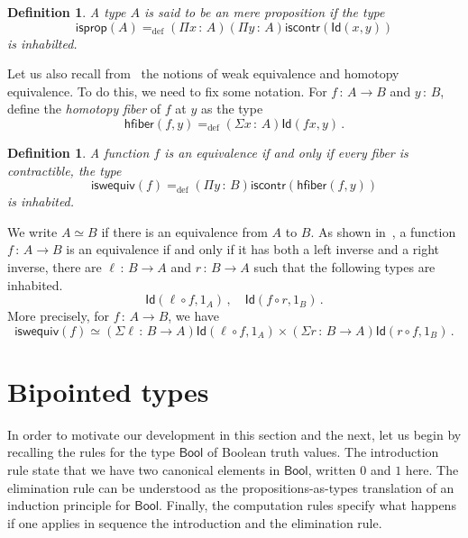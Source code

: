 \documentclass[10pt,a4paper,oneside,reqno]{amsart}
\theoremstyle{mythm}
\theoremstyle{mydef}
\newtheorem{definition}[theorem]{Definition}
\theoremstyle{myrmk}
\newcommand{\ie}{\text{i.e.\ }}
\newcommand{\defeq}{=_{\mathrm{def}}}
\newcommand{\co}{\,{:}\,}
\newcommand{\hfiber}{\mathsf{hfiber}}
\newcommand{\iscontr}{\mathsf{iscontr}}
\newcommand{\isprop}{\mathsf{isprop}}
\newcommand{\iswequiv}{\mathsf{iswequiv}}
\newcommand{\Bool}{\mathsf{Bool}}
\newcommand{\Id}{\mathsf{Id}}
\begin{document}
\begin{definition} A type $A$ is said to be an \emph{mere proposition} if the type
\[
\isprop(A) \defeq (\Pi x \co A)(\Pi  y \co A) \iscontr( \Id(x,y)) 
\]
is inhabilted.
\end{definition}

Let us also recall from~\cite{VoevodskyV:unifc} the notions of weak equivalence and homotopy equivalence. To do this, we need to fix some notation. For $f \co A \rightarrow B$ and $y \co B$, define the \emph{homotopy fiber} of $f$ at $y$ as the type
\[
 \hfiber(f,y) \defeq (\Sigma x \co A) \Id(f x, y) \, .
\]


\begin{definition} A function $f$ is  an \emph{equivalence} if and only if every fiber is contractible, \ie the type
\[
 \iswequiv(f) \defeq (\Pi y \co B)  \iscontr(\hfiber(f,y)) 
\]
is inhabited. 
\end{definition}

 We write $A\simeq B$ if there is an equivalence from $A$ to $B$.   As shown in~\cite{HoTT}, a function $f \co A \rightarrow B$ is an equivalence if and only if  it has both a left inverse and a right inverse, \ie there are 
$\ell \co B \to A$ and $r \co B \to A$ such that the following types are inhabited. 
\[
 \Id(\ell \circ f, 1_A)\, ,  \quad  \Id(f \circ r, 1_B) \, .
 \] 
More precisely, for $f \co A \rightarrow B$, we have
 \[ 
 \textstyle
 \iswequiv(f) \simeq (\Sigma \ell \co B \to A) \Id( \ell \circ f, 1_A) \times (\Sigma r \co B \to A) \Id( r \circ f , 1_B) \, .
 \]



\newpage

\section{Bipointed types}
\label{sec:bip}

In order to motivate our development in this section and the next, 
let us begin by recalling the rules for the type $\Bool$ of Boolean truth values. The introduction rule state that we have two canonical elements in $\Bool$, written $0$ and $1$ here. The elimination rule can be understood as the propositions-as-types translation of an induction principle for $\Bool$. Finally, the computation rules specify what happens if one applies in sequence the introduction and the elimination rule.
\end{document}
